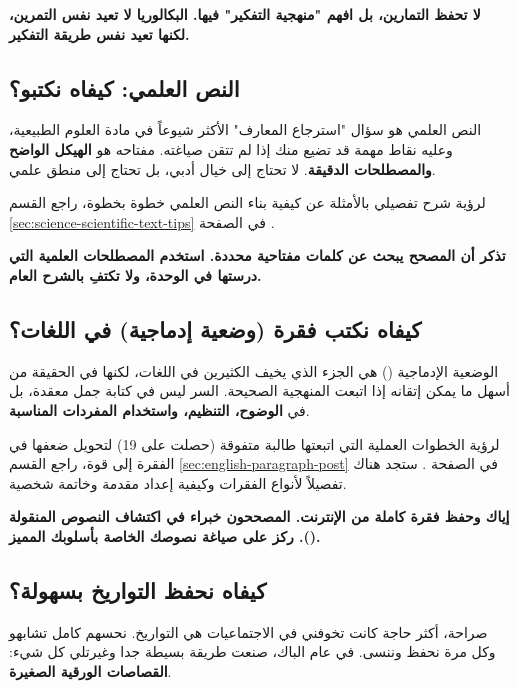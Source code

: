 \documentclass[12pt,a4paper]{book}
\newcommand{\importantAr}[1]{%
	\begin{important}
		\bfseries #1
	\end{important}
}
\begin{document}
	\importantAr{لا تحفظ التمارين، بل افهم "منهجية التفكير" فيها. البكالوريا لا تعيد نفس التمرين، لكنها تعيد نفس طريقة التفكير.}
	
	\subsection{النص العلمي: كيفاه نكتبو؟}
	
	النص العلمي هو سؤال "استرجاع المعارف" الأكثر شيوعاً في مادة العلوم الطبيعية، وعليه نقاط مهمة قد تضيع منك إذا لم تتقن صياغته. مفتاحه هو \textbf{الهيكل الواضح والمصطلحات الدقيقة}. لا تحتاج إلى خيال أدبي، بل تحتاج إلى منطق علمي.
	
	لرؤية شرح تفصيلي بالأمثلة عن كيفية بناء النص العلمي خطوة بخطوة، راجع القسم \ref{sec:science-scientific-text-tips} في الصفحة \pageref{sec:science-scientific-text-tips}.
	
	\importantAr{تذكر أن المصحح يبحث عن كلمات مفتاحية محددة. استخدم المصطلحات العلمية التي درستها في الوحدة، ولا تكتفِ بالشرح العام.}
	
	\subsection{كيفاه نكتب فقرة (وضعية إدماجية) في اللغات؟}
	
	الوضعية الإدماجية () هي الجزء الذي يخيف الكثيرين في اللغات، لكنها في الحقيقة من أسهل ما يمكن إتقانه إذا اتبعت المنهجية الصحيحة. السر ليس في كتابة جمل معقدة، بل في \textbf{الوضوح، التنظيم، واستخدام المفردات المناسبة}.
	
	لرؤية الخطوات العملية التي اتبعتها طالبة متفوقة (حصلت على 19) لتحويل ضعفها في الفقرة إلى قوة، راجع القسم \ref{sec:english-paragraph-post} في الصفحة \pageref{sec:english-paragraph-post}. ستجد هناك تفصيلاً لأنواع الفقرات وكيفية إعداد مقدمة وخاتمة شخصية.
	
	\importantAr{إياك وحفظ فقرة كاملة من الإنترنت. المصححون خبراء في اكتشاف النصوص المنقولة (\LR{copie-collé}). ركز على صياغة نصوصك الخاصة بأسلوبك المميز.}
	
	\subsection{كيفاه نحفظ التواريخ بسهولة؟}
	\label{sec:history-dates-story}
	
	صراحة، أكثر حاجة كانت تخوفني في الاجتماعيات هي التواريخ. نحسهم كامل تشابهو وكل مرة نحفظ وننسى. في عام الباك، صنعت طريقة بسيطة جدا وغيرتلي كل شيء: \textbf{القصاصات الورقية الصغيرة}.
	
\end{document}
